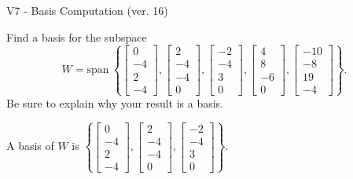 \begin{exercise}
  \begin{exerciseTitle}V7 - Basis Computation (ver. 16)\end{exerciseTitle}
  \begin{exerciseStatement}
    Find a basis for the subspace 
\[W=\mathrm{span}\ \left\{\left[\begin{array}{r}
0 \\
-4 \\
2 \\
-4
\end{array}\right] , \left[\begin{array}{r}
2 \\
-4 \\
-4 \\
0
\end{array}\right] , \left[\begin{array}{r}
-2 \\
-4 \\
3 \\
0
\end{array}\right] , \left[\begin{array}{r}
4 \\
8 \\
-6 \\
0
\end{array}\right] , \left[\begin{array}{r}
-10 \\
-8 \\
19 \\
-4
\end{array}\right]\right\}.\]
 Be sure to explain why your result is a basis.


  \end{exerciseStatement}
  \begin{exerciseAnswer}
   A basis of \(W\) is  \(\left\{\left[\begin{array}{r}
0 \\
-4 \\
2 \\
-4
\end{array}\right] , \left[\begin{array}{r}
2 \\
-4 \\
-4 \\
0
\end{array}\right] , \left[\begin{array}{r}
-2 \\
-4 \\
3 \\
0
\end{array}\right]\right\}\).
  


  \end{exerciseAnswer}
\end{exercise}